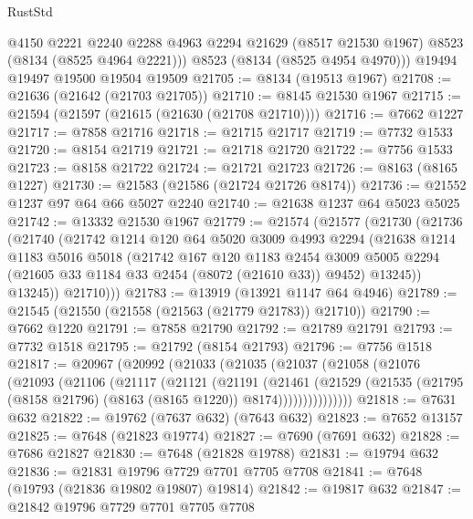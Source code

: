 \begin{lexlean}{RustStd}
\begin{coremodule}
        @4150
        @2221
        @2240
        @2288
        @4963
        @2294
        @21629
        (@8517 @21530 @1967)
        @8523
        (@8134 (@8525 @4964 @2221)))
      @8523
      (@8134 (@8525 @4954 @4970)))
    @19494
    @19497
    @19500
    @19504
    @19509
@21705 := @8134 (@19513 @1967)
@21708 := @21636 (@21642 (@21703 @21705))
@21710 := @8145 @21530 @1967
@21715 := @21594 (@21597 (@21615 (@21630 (@21708 @21710))))
@21716 := @7662 @1227
@21717 := @7858 @21716
@21718 := @21715 @21717
@21719 := @7732 @1533
@21720 := @8154 @21719
@21721 := @21718 @21720
@21722 := @7756 @1533
@21723 := @8158 @21722
@21724 := @21721 @21723
@21726 := @8163 (@8165 @1227)
@21730 := @21583 (@21586 (@21724 @21726 @8174))
@21736 := @21552 @1237 @97 @64 @66 @5027 @2240
@21740 := @21638 @1237 @64 @5023 @5025
@21742 := @13332 @21530 @1967
@21779 := @21574
    (@21577
      (@21730
        (@21736
          (@21740
            (@21742
              @1214
              @120
              @64
              @5020
              @3009
              @4993
              @2294
              (@21638
                @1214
                @1183
                @5016
                @5018
                (@21742
                  @167
                  @120
                  @1183
                  @2454
                  @3009
                  @5005
                  @2294
                  (@21605 @33 @1184 @33 @2454 (@8072 (@21610 @33)) @9452)
                  @13245))
              @13245))
          @21710)))
@21783 := @13919 (@13921 @1147 @64 @4946)
@21789 := @21545 (@21550 (@21558 (@21563 (@21779 @21783)) @21710))
@21790 := @7662 @1220
@21791 := @7858 @21790
@21792 := @21789 @21791
@21793 := @7732 @1518
@21795 := @21792 (@8154 @21793)
@21796 := @7756 @1518
@21817 := @20967
    (@20992
      (@21033
        (@21035
          (@21037
            (@21058
              (@21076
                (@21093
                  (@21106
                    (@21117
                      (@21121
                        (@21191
                          (@21461
                            (@21529
                              (@21535
                                (@21795 (@8158 @21796) (@8163 (@8165 @1220)) @8174)))))))))))))))
@21818 := @7631 @632
@21822 := @19762 (@7637 @632) (@7643 @632)
@21823 := @7652 @13157
@21825 := @7648 (@21823 @19774)
@21827 := @7690 (@7691 @632)
@21828 := @7686 @21827
@21830 := @7648 (@21828 @19788)
@21831 := @19794 @632
@21836 := @21831 @19796 @7729 @7701 @7705 @7708
@21841 := @7648 (@19793 (@21836 @19802 @19807) @19814)
@21842 := @19817 @632
@21847 := @21842 @19796 @7729 @7701 @7705 @7708

\end{coremodule}
\end{lexlean}
